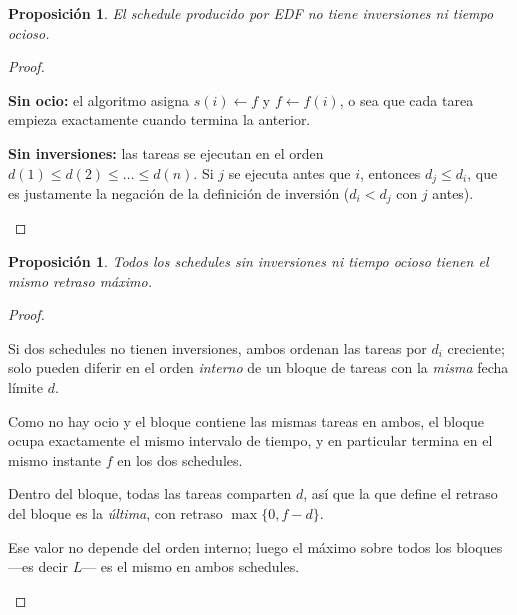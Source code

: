 \documentclass[11pt,a4paper]{article}
\theoremstyle{plain}
\newtheorem{proposicion}[teorema]{Proposición}
\theoremstyle{definition}
\theoremstyle{remark}
\begin{document}
\begin{proposicion}
El schedule producido por EDF no tiene inversiones ni tiempo ocioso.
\end{proposicion}
\begin{proof}
\begin{pasos}
\item \textbf{Sin ocio:} el algoritmo asigna $s(i)\leftarrow f$ y $f\leftarrow f(i)$,
o sea que cada tarea empieza exactamente cuando termina la anterior.
\item \textbf{Sin inversiones:} las tareas se ejecutan en el orden $d(1)\le d(2)\le
\dots\le d(n)$. Si $j$ se ejecuta antes que $i$, entonces $d_j\le d_i$, que es
justamente la negación de la definición de inversión ($d_i<d_j$ con $j$ antes). \qedhere
\end{pasos}
\end{proof}

\begin{proposicion}\label{p:iguales}
Todos los schedules sin inversiones ni tiempo ocioso tienen el \emph{mismo} retraso
máximo.
\end{proposicion}
\begin{proof}
\begin{pasos}
\item Si dos schedules no tienen inversiones, ambos ordenan las tareas por $d_i$
creciente; solo pueden diferir en el orden \emph{interno} de un bloque de tareas con la
\emph{misma} fecha límite $d$.
\item Como no hay ocio y el bloque contiene las mismas tareas en ambos, el bloque ocupa
exactamente el mismo intervalo de tiempo, y en particular termina en el mismo instante
$f$ en los dos schedules.
\item Dentro del bloque, todas las tareas comparten $d$, así que la que define el
retraso del bloque es la \emph{última}, con retraso $\max\{0,f-d\}$.
\item Ese valor no depende del orden interno; luego el máximo sobre todos los bloques
—es decir $L$— es el mismo en ambos schedules. \qedhere
\end{pasos}
\end{proof}
\end{document}
